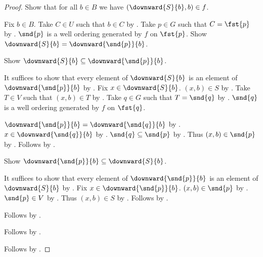 \begin{proof}
    Show that for all $b\in B$ we have $(\downward{S}{b},b)\in f$.
    \begin{subproof}
        Fix $b\in B$.
        Take $C\in U$ such that $b\in C$ by .
        Take $p\in G$ such that $C=\fst{p}$ by \auto.
        $\snd{p}$ is a well ordering generated by $f$ on $\fst{p}$.
        Show $\downward{S}{b}=\downward{\snd{p}}{b}$.
        \begin{subproof}
            Show $\downward{S}{b}\subseteq\downward{\snd{p}}{b}$.
            \begin{subproof}
                It suffices to show that every element of $\downward{S}{b}$ is an element of $\downward{\snd{p}}{b}$
                    by .
                Fix $x\in\downward{S}{b}$.
                $(x,b)\in S$ by .
                Take $T\in V$ such that $(x,b)\in T$ by .
                Take $q\in G$ such that $T=\snd{q}$ by \auto.
                $\snd{q}$ is a well ordering generated by $f$ on $\fst{q}$.
                \begin{byCase}
                    $\downward{\snd{p}}{b}=\downward{\snd{q}}{b}$ by .
                    $x\in\downward{\snd{q}}{b}$ by .
                    $\snd{q}\subseteq\snd{p}$ by .
                    Thus $(x,b)\in\snd{p}$ by .
                    Follows by .
                \end{byCase}
            \end{subproof}
            Show $\downward{\snd{p}}{b}\subseteq\downward{S}{b}$.
            \begin{subproof}
                It suffices to show that every element of $\downward{\snd{p}}{b}$ is an element of $\downward{S}{b}$
                    by .
                Fix $x\in\downward{\snd{p}}{b}$.
                $(x,b)\in\snd{p}$ by .
                $\snd{p}\in V$ by \auto.
                Thus $(x,b)\in S$ by .
                Follows by .
            \end{subproof}
            Follows by .
        \end{subproof}
        Follows by .
    \end{subproof}

    Follows by .
\end{proof}
